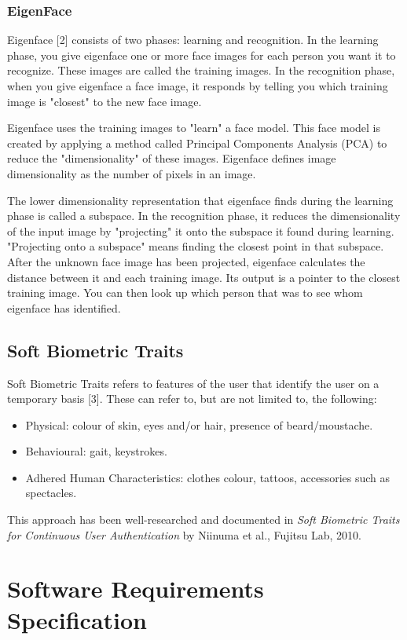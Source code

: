 \documentclass[12pt]{article}			%
\begin{document}
\subsubsection{ EigenFace }
Eigenface [2] consists of two phases: learning and recognition. In the learning phase, you give eigenface one or more face images for each person you want it to recognize. These images are called the training images. In the recognition phase, when you give eigenface a face image, it responds by telling you which training image is "closest" to the new face image.

Eigenface uses the training images to "learn" a face model. This face model is created by applying a method called Principal Components Analysis (PCA) to reduce the "dimensionality" of these images. Eigenface defines image dimensionality as the number of pixels in an image.

The lower dimensionality representation that eigenface finds during the learning phase is called a subspace. In the recognition phase, it reduces the dimensionality of the input image by "projecting" it onto the subspace it found during learning. "Projecting onto a subspace" means finding the closest point in that subspace. After the unknown face image has been projected, eigenface calculates the distance between it and each training image. Its output is a pointer to the closest training image. You can then look up which person that was to see whom eigenface has identified.

\subsection{ Soft Biometric Traits }
Soft Biometric Traits refers to features of the user that identify the user on a temporary basis [3]. These can refer to, but are not limited to, the following:
\begin{itemize}
	\item{} Physical: colour of skin, eyes and/or hair, presence of beard/moustache.
	\item{} Behavioural: gait, keystrokes.
	\item{} Adhered Human Characteristics: clothes colour, tattoos, accessories such as spectacles.
\end{itemize}

This approach has been well-researched and documented in \textit{Soft Biometric Traits for Continuous User Authentication} by Niinuma et al., Fujitsu Lab, 2010.

\section{Software Requirements Specification }
\end{document}
